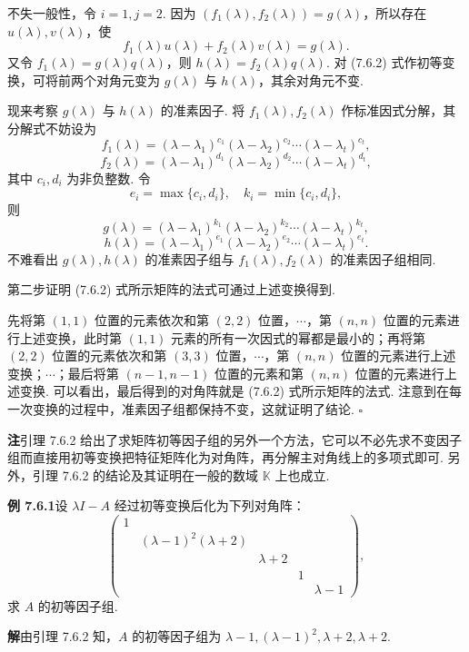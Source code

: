 \documentclass[UTF8,12pt,a4paper,fontset=fandol]{ctexart}
\begin{document}
不失一般性，令 $i=1,j=2$. 因为 $(f_1(\lambda),f_2(\lambda))=g(\lambda)$，所以存在 $u(\lambda),v(\lambda)$，使
\[
f_1(\lambda)u(\lambda)+f_2(\lambda)v(\lambda)=g(\lambda).
\]
又令 $f_1(\lambda)=g(\lambda)q(\lambda)$，则 $h(\lambda)=f_2(\lambda)q(\lambda)$. 对 (7.6.2) 式作初等变换，可将前两个对角元变为 $g(\lambda)$ 与 $h(\lambda)$，其余对角元不变.

现来考察 $g(\lambda)$ 与 $h(\lambda)$ 的准素因子. 将 $f_1(\lambda),f_2(\lambda)$ 作标准因式分解，其分解式不妨设为
\[
f_1(\lambda)=(\lambda-\lambda_1)^{c_1}(\lambda-\lambda_2)^{c_2}\cdots(\lambda-\lambda_t)^{c_t},
\]
\[
f_2(\lambda)=(\lambda-\lambda_1)^{d_1}(\lambda-\lambda_2)^{d_2}\cdots(\lambda-\lambda_t)^{d_t},
\]
其中 $c_i,d_i$ 为非负整数. 令
\[
e_i=\max\{c_i,d_i\},\quad k_i=\min\{c_i,d_i\},
\]
则
\[
g(\lambda)=(\lambda-\lambda_1)^{k_1}(\lambda-\lambda_2)^{k_2}\cdots(\lambda-\lambda_t)^{k_t},
\]
\[
h(\lambda)=(\lambda-\lambda_1)^{e_1}(\lambda-\lambda_2)^{e_2}\cdots(\lambda-\lambda_t)^{e_t}.
\]
不难看出 $g(\lambda),h(\lambda)$ 的准素因子组与 $f_1(\lambda),f_2(\lambda)$ 的准素因子组相同.

第二步证明 (7.6.2) 式所示矩阵的法式可通过上述变换得到.

先将第 $(1,1)$ 位置的元素依次和第 $(2,2)$ 位置，$\cdots$，第 $(n,n)$ 位置的元素进行上述变换，此时第 $(1,1)$ 元素的所有一次因式的幂都是最小的；再将第 $(2,2)$ 位置的元素依次和第 $(3,3)$ 位置，$\cdots$，第 $(n,n)$ 位置的元素进行上述变换；$\cdots$；最后将第 $(n-1,n-1)$ 位置的元素和第 $(n,n)$ 位置的元素进行上述变换. 可以看出，最后得到的对角阵就是 (7.6.2) 式所示矩阵的法式. 注意到在每一次变换的过程中，准素因子组都保持不变，这就证明了结论. $\square$

\noindent\textbf{注}\quad 引理 7.6.2 给出了求矩阵初等因子组的另外一个方法，它可以不必先求不变因子组而直接用初等变换把特征矩阵化为对角阵，再分解主对角线上的多项式即可. 另外，引理 7.6.2 的结论及其证明在一般的数域 $\mathbb{K}$ 上也成立.

\noindent\textbf{例 7.6.1}\quad 设 $\lambda I-A$ 经过初等变换后化为下列对角阵：
\[
\left(\begin{array}{ccccc}
1 & & & & \\
& (\lambda-1)^2(\lambda+2) & & & \\
& & \lambda+2 & & \\
& & & 1 & \\
& & & & \lambda-1
\end{array}\right),
\]
求 $A$ 的初等因子组.

\noindent\textbf{解}\quad 由引理 7.6.2 知，$A$ 的初等因子组为 $\lambda-1,(\lambda-1)^2,\lambda+2,\lambda+2$.
\end{document}
